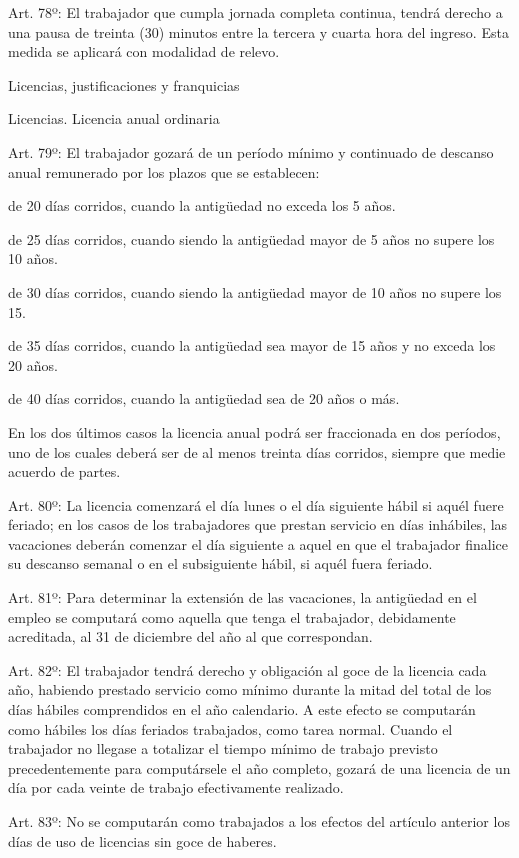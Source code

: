 \documentclass[]{article}
\begin{document}
Art. 78º: El trabajador que cumpla jornada completa continua, tendrá
derecho a una pausa de treinta (30) minutos entre la tercera y cuarta
hora del ingreso. Esta medida se aplicará con modalidad de relevo.

Licencias, justificaciones y franquicias

Licencias. Licencia anual ordinaria

Art. 79º: El trabajador gozará de un período mínimo y continuado de
descanso anual remunerado por los plazos que se establecen:

de 20 días corridos, cuando la antigüedad no exceda los 5 años.

de 25 días corridos, cuando siendo la antigüedad mayor de 5 años no
supere los 10 años.

de 30 días corridos, cuando siendo la antigüedad mayor de 10 años no
supere los 15.

de 35 días corridos, cuando la antigüedad sea mayor de 15 años y no
exceda los 20 años.

de 40 días corridos, cuando la antigüedad sea de 20 años o más.

En los dos últimos casos la licencia anual podrá ser fraccionada en dos
períodos, uno de los cuales deberá ser de al menos treinta días
corridos, siempre que medie acuerdo de partes.

Art. 80º: La licencia comenzará el día lunes o el día siguiente hábil si
aquél fuere feriado; en los casos de los trabajadores que prestan
servicio en días inhábiles, las vacaciones deberán comenzar el día
siguiente a aquel en que el trabajador finalice su descanso semanal o en
el subsiguiente hábil, si aquél fuera feriado.

Art. 81º: Para determinar la extensión de las vacaciones, la antigüedad
en el empleo se computará como aquella que tenga el trabajador,
debidamente acreditada, al 31 de diciembre del año al que correspondan.

Art. 82º: El trabajador tendrá derecho y obligación al goce de la
licencia cada año, habiendo prestado servicio como mínimo durante la
mitad del total de los días hábiles comprendidos en el año calendario. A
este efecto se computarán como hábiles los días feriados trabajados,
como tarea normal. Cuando el trabajador no llegase a totalizar el tiempo
mínimo de trabajo previsto precedentemente para computársele el año
completo, gozará de una licencia de un día por cada veinte de trabajo
efectivamente realizado.

Art. 83º: No se computarán como trabajados a los efectos del artículo
anterior los días de uso de licencias sin goce de haberes.
\end{document}
